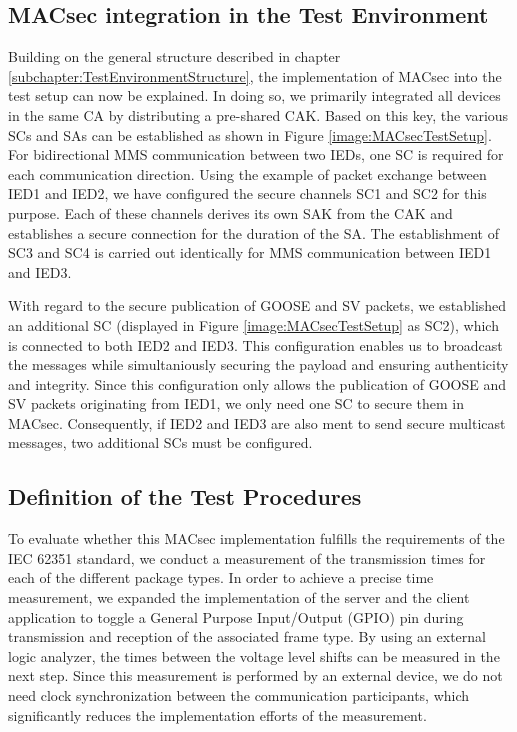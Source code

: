\documentclass[conference, onecolumn, a4paper]{IEEEtran}
\begin{document}
\subsection{MACsec integration in the Test Environment}
\label{subchapter:TestEnvironmentMACsec}
\noindent Building on the general structure described in chapter \ref{subchapter:TestEnvironmentStructure}, the implementation of MACsec into the test 
setup can now be explained. In doing so, we primarily integrated all devices in the same CA by distributing a pre-shared CAK. Based on this key, the 
various SCs and SAs can be established as shown in Figure \ref{image:MACsecTestSetup}. For bidirectional MMS communication between two IEDs, one SC is 
required for each communication direction. Using the example of packet exchange between IED1 and IED2, we have configured the secure channels SC1 and 
SC2 for this purpose. Each of these channels derives its own SAK from the CAK and establishes a secure connection for the duration of the SA. The 
establishment of SC3 and SC4 is carried out identically for MMS communication between IED1 and IED3.

\smallskip
With regard to the secure publication of GOOSE and SV packets, we established an additional SC (displayed in Figure \ref{image:MACsecTestSetup} as SC2), 
which is connected to both IED2 and IED3. This configuration enables us to broadcast the messages while simultaniously securing the payload and ensuring 
authenticity and integrity. Since this configuration only allows the publication of GOOSE and SV packets originating from IED1, we only need one SC 
to secure them in MACsec. Consequently, if IED2 and IED3 are also ment to send secure multicast messages, two additional SCs must be configured.   

\subsection{Definition of the Test Procedures}
\label{subchapter:TestProcedures}
\noindent To evaluate whether this MACsec implementation fulfills the requirements of the IEC 62351 standard, we conduct a measurement of the 
transmission times for each of the different package types. In order to achieve a precise time measurement, we expanded the implementation of the server 
and the client application to toggle a General Purpose Input/Output (GPIO) pin during transmission and reception of the associated frame type. 
By using an external logic analyzer, the times between the voltage level shifts can be measured in the next step. Since this measurement is performed 
by an external device, we do not need clock synchronization between the communication participants, which significantly reduces the implementation 
efforts of the measurement. 
\end{document}
